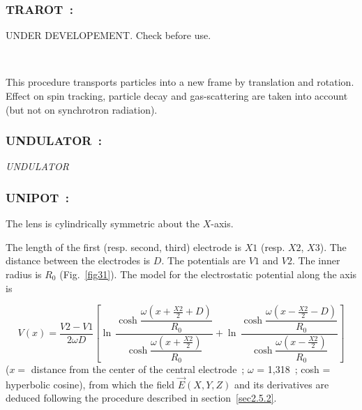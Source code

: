 \newpage

\subsubsection*{TRAROT~: \TRAROTTitl} \label{TRAROT} 

UNDER DEVELOPEMENT. Check before use. 

~

This procedure transports particles into a new frame by translation and rotation. Effect on spin tracking, 
particle decay and gas-scattering are taken into account (but not on synchrotron radiation).





\newpage


\subsubsection*{UNDULATOR~: \UNDULATORTitl}\label{UNDULATOR}  

\textsl{UNDULATOR} 


\bigskip


\vfill
\begin{figure}[H]
  \vspace{5cm}
  {\setlength{\captionwidth}{12cm}
	 }
\end{figure}
\vfill

\newpage

\subsubsection*{UNIPOT~: \UNIPOTTitl} \label{UNIPOT} 

The lens is cylindrically symmetric about the $ X$-axis.  
\bigskip

\noindent The length of the first (resp. second, third) electrode is $ X1 $
(resp. $ X2$, $X3$). The distance between the electrodes is $ D$.  
The potentials are $ V1 $ and $V2$.  The inner radius is $ R_0 $ (Fig.~\ref{fig31}).  
The model for the electrostatic potential along the axis is~\cite{Biblio19}  %

$$ V(x) = 
    \dfrac{V2-V1 }{ 2\omega D} \left[
    \ln\, \dfrac{\cosh 
    	\dfrac{\omega \left(x+ \frac{X2}{ 2}+D \right) }{ R_0} }{
       \cosh \dfrac{\omega \left(x+\frac{X2 }{ 2}\right) }{ R_0}}  
    + \ln\,  \dfrac{\cosh \dfrac{\omega \left(x-\frac{X2 }{ 2}-D\right) }{R_0} }{
       \cosh \dfrac{\omega \left(x-\frac{X2 }{ 2}\right) }{R_0} }
     \right] $$
%
($ x  = $ distance from the center of the central electrode~;
$\omega$  = 1,318~; cosh = hyperbolic cosine), from which the field $ \vec  E(X,Y,Z) $ and its
derivatives are deduced following the procedure described in section~\ref{sec2.5.2}. 

